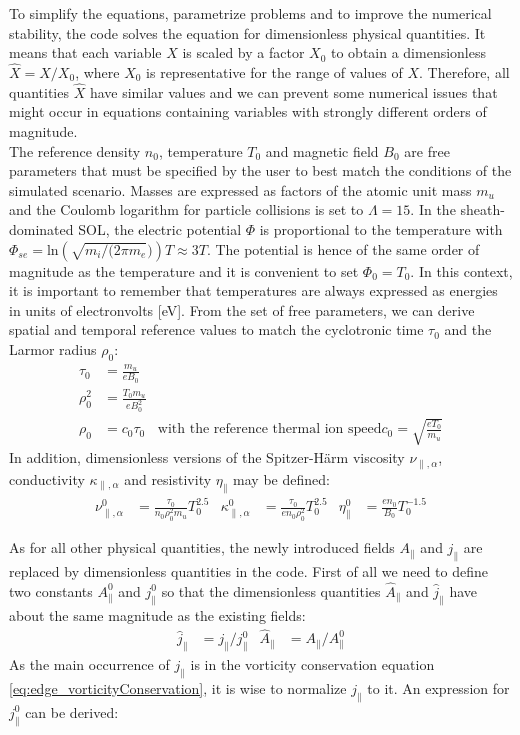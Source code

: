To simplify the equations, parametrize problems and to improve the numerical stability, the code solves the equation for dimensionless physical quantities. It means that each variable $X$ is scaled by a factor $X_0$ to obtain a dimensionless $\hat{X} = X/X_0$, where $X_0$ is representative for the range of values of $X$. Therefore, all quantities $\hat{X}$ have similar values and we can prevent some numerical issues that might occur in equations containing variables with strongly different orders of magnitude. \\

The reference density $n_0$, temperature $T_0$ and magnetic field $B_0$ are free parameters that must be specified by the user to best match the conditions of the simulated scenario. Masses are expressed as factors of the atomic unit mass $m_u$ and the Coulomb logarithm for particle collisions is set to $\Lambda = 15$. In the sheath-dominated SOL, the electric potential $\Phi$ is proportional to the temperature with $\Phi_{se} = $ln$\left(\sqrt{m_i/(2\pi m_e})\right)T\approx3T$. The potential is hence of the same order of magnitude as the temperature and it is convenient to set $\Phi_0 = T_0$. In this context, it is important to remember that temperatures are always expressed as energies in units of electronvolts [eV]. From the set of free parameters, we can derive spatial and temporal reference values to match the cyclotronic time $\tau_0$ and the Larmor radius $\rho_0$:
\begin{align}
	\tau_0 &= \frac{m_u}{eB_0} \\
	\rho_0^2 &= \frac{T_0m_u}{eB_0^2} \\
	\rho_0 &= c_0 \tau_0 & \text{with the reference thermal ion speed} c_0 = \sqrt{\frac{eT_0}{m_u}}
\end{align}
In addition, dimensionless versions of the Spitzer-Härm viscosity $\nu_{\parallel,\alpha}$, conductivity $\kappa_{\parallel,\alpha}$ and resistivity $\eta_\parallel$ may be defined:
\begin{align}
	\nu_{\parallel,\alpha}^0 &= \frac{\tau_0}{n_0\rho_0^2m_u}T_0^{2.5} & %
	\kappa_{\parallel,\alpha}^0 &= \frac{\tau_0}{en_0\rho_0^2}T_0^{2.5} & %
	\eta_\parallel^0 &= \frac{en_0}{B_0}T_0^{-1.5} %
\end{align}

As for all other physical quantities, the newly introduced fields $A_\parallel$ and $j_\parallel$ are replaced by dimensionless quantities in the code. First of all we need to define two constants $A_\parallel^0$ and $j_\parallel^0$ so that the dimensionless quantities $\hat{A}_\parallel$ and $\hat{j}_\parallel$ have about the same magnitude as the existing fields:
\begin{align}
	\hat{j}_\parallel &= j_\parallel / j_\parallel^0 & \hat{A}_\parallel &= A_\parallel / A_\parallel^0
\end{align}
As the main occurrence of $j_\parallel$ is in the vorticity conservation equation \ref{eq:edge_vorticityConservation}, it is wise to normalize $j_\parallel$ to it. An expression for $j_\parallel^0$ can be derived:

